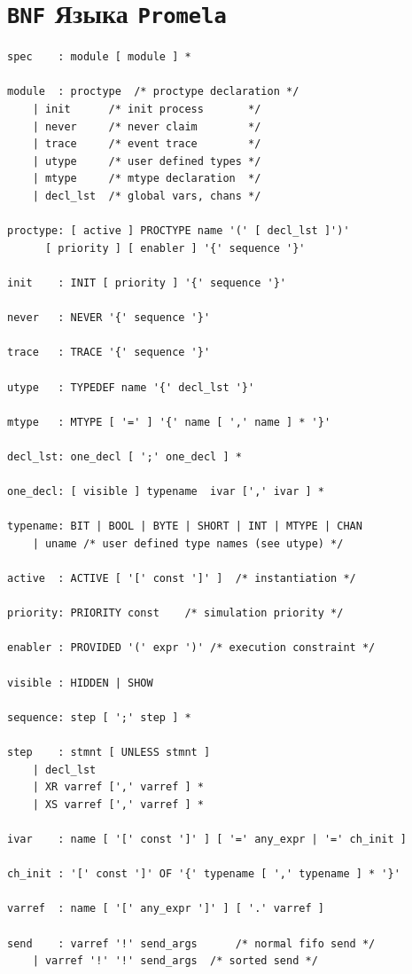 \documentclass[12pt, twoside]{report}
\begin{document}


\section*{\texttt{BNF} Языка \texttt{Promela}}\label{promela_BNF}
\begin{verbatim}
spec	: module [ module ] *

module	: proctype	/* proctype declaration */
	| init		/* init process       */
	| never		/* never claim        */
	| trace		/* event trace        */
	| utype		/* user defined types */
	| mtype		/* mtype declaration  */
	| decl_lst	/* global vars, chans */

proctype: [ active ] PROCTYPE name '(' [ decl_lst ]')'
	  [ priority ] [ enabler ] '{' sequence '}'

init	: INIT [ priority ] '{' sequence '}'

never	: NEVER	'{' sequence '}'

trace	: TRACE '{' sequence '}'

utype	: TYPEDEF name '{' decl_lst '}'

mtype	: MTYPE [ '=' ] '{' name [ ',' name ] * '}'

decl_lst: one_decl [ ';' one_decl ] *

one_decl: [ visible ] typename  ivar [',' ivar ] *

typename: BIT | BOOL | BYTE | SHORT | INT | MTYPE | CHAN
	| uname	/* user defined type names (see utype) */

active  : ACTIVE [ '[' const ']' ]	/* instantiation */

priority: PRIORITY const	/* simulation priority */

enabler : PROVIDED '(' expr ')'	/* execution constraint */

visible	: HIDDEN | SHOW

sequence: step [ ';' step ] *

step    : stmnt	[ UNLESS stmnt ]
	| decl_lst
	| XR varref [',' varref ] *
	| XS varref [',' varref ] *

ivar    : name [ '[' const ']' ] [ '=' any_expr | '=' ch_init ]

ch_init : '[' const ']' OF '{' typename [ ',' typename ] * '}'

varref	: name [ '[' any_expr ']' ] [ '.' varref ]

send    : varref '!' send_args		/* normal fifo send */
	| varref '!' '!' send_args	/* sorted send */


\end{verbatim}
\end{document}
